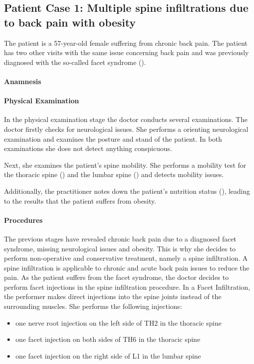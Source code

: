 \subsection{Patient Case 1: Multiple spine infiltrations due to back pain with obesity}\label{subsec:patient-a---multiple-spine-infiltrations-due-to-backpain-with-obesity}
The patient is a 57-year-old female suffering from chronic back pain.
The patient has two other visits with the same issue concerning back pain and was previously diagnosed with the so-called facet syndrome ().

\paragraph{Anamnesis}


\paragraph{Physical Examination}
In the physical examination stage the doctor conducts several examinations.
The doctor firstly checks for neurological issues.
She performs a orienting neurological examination and examines the posture and stand of the patient.
In both examinations she does not detect anything conspicuous.

Next, she examines the patient's spine mobility.
She performs a mobility test for the thoracic spine () and the lumbar spine () and detects mobility issues.

Additionally, the practitioner notes down the patient's nutrition status (), leading to the results that the patient suffers from obesity.

\paragraph{Procedures}
The previous stages have revealed chronic back pain due to a diagnosed facet syndrome, missing neurological issues and obesity.
This is why she decides to perform non-operative and conservative treatment, namely a spine infiltration.
A spine infiltration is applicable to chronic and acute back pain issues to reduce the pain.
As the patient suffers from the facet syndrome, the doctor decides to perform facet injections in the spine infiltration procedure.
In a Facet Infiltration, the performer makes direct injections into the spine joints instead of the surrounding muscles.
She performs the following injections:
\begin{itemize}
    \item one nerve root injection on the left side of TH2 in the thoracic spine
    \item one facet injection on both sides of TH6 in the thoracic spine
    \item one facet injection on the right side of L1 in the lumbar spine
\end{itemize}

